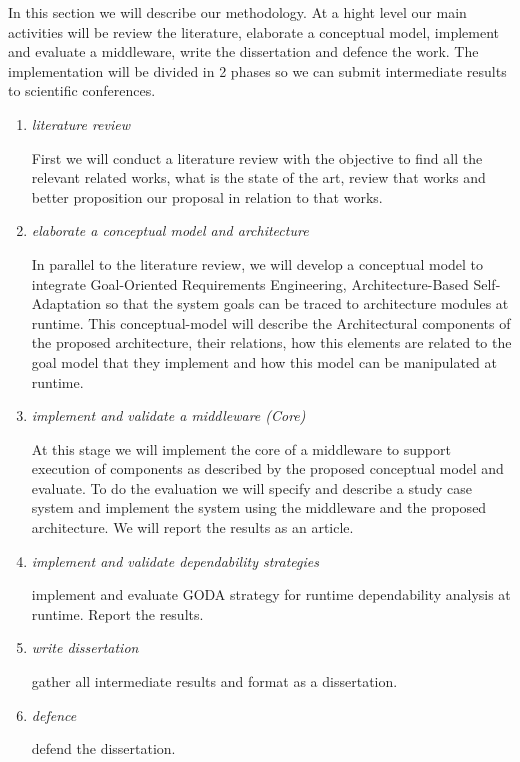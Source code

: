In this section we will describe our methodology. At a hight level our main activities will be review the literature, elaborate a conceptual model, implement and evaluate a middleware, write the dissertation and defence the work.
The implementation will be divided in 2 phases so we can submit intermediate results to scientific conferences.

\begin{enumerate}

\item \emph{literature review}

First we will conduct a literature review with the objective to find all the relevant related works, what is the state of the art, review that works and better proposition our proposal in relation to that works.

\item \emph{elaborate a conceptual model and architecture}

In parallel to the literature review, we will develop a conceptual model to integrate Goal-Oriented Requirements Engineering, Architecture-Based Self-Adaptation so that the system goals can be traced to architecture modules at runtime. This conceptual-model will describe the Architectural components of the proposed architecture, their relations, how this elements are related to the goal model that they implement and how this model can be manipulated at runtime.


\item \emph{implement and validate a middleware (Core)}

At this stage we will implement the core of a middleware to support execution of components as described by the proposed conceptual model and evaluate. To do the evaluation we will specify and describe a study case system and implement the system using the middleware and the proposed architecture. We will report the results as an article.





\item \emph{implement and validate dependability strategies}

 implement and evaluate GODA\cite{mendonca_dependability_2015} strategy for runtime dependability analysis at runtime. Report the results.

\item \emph{write dissertation}

gather all intermediate results and format as a dissertation.

\item \emph{defence}

defend the dissertation.

\end{enumerate}
